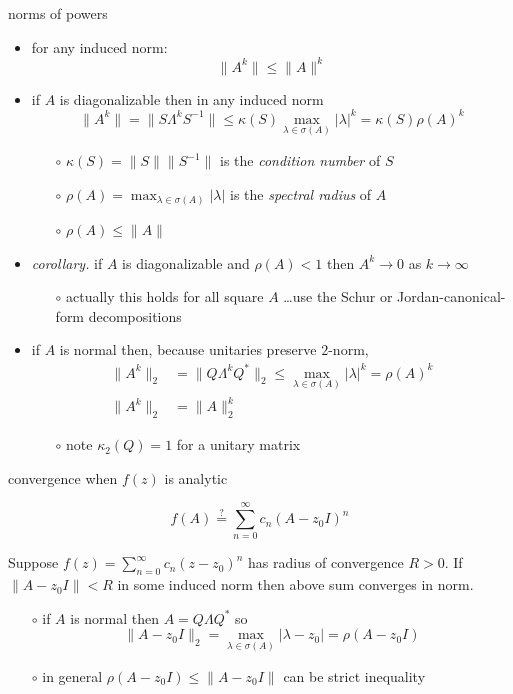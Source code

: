 \documentclass[10pt,hyperref]{beamer}
\begin{document}
\begin{frame}{norms of powers}

\begin{itemize}
\item for any induced norm:
    $$\|A^k\| \le \|A\|^k$$
\item if $A$ is diagonalizable then in any induced norm
    $$\|A^k\| = \|S\Lambda^k S^{-1}\| \le \kappa(S) \max_{\lambda\in\sigma(A)} |\lambda|^k = \kappa(S) \rho(A)^k$$

\vspace{-3mm}
    \begin{itemize}
    \item[$\circ$] $\kappa(S)=\|S\|\|S^{-1}\|$ is the \emph{condition number} of $S$
    \item[$\circ$] $\rho(A)=\max_{\lambda\in\sigma(A)} |\lambda|$ is the \emph{spectral radius} of $A$
    \item[$\circ$] $\rho(A)\le \|A\|$
    \end{itemize}
\item \emph{corollary.} if $A$ is diagonalizable and $\rho(A)<1$ then $A^k \to 0$ as $k\to\infty$
    \begin{itemize}
    \item[$\circ$] actually this holds for all square $A$ \dots use the Schur or Jordan-canonical-form decompositions
    \end{itemize}
\item if $A$ is normal then, because unitaries preserve $2$-norm,
\begin{align*}
\|A^k\|_2 &= \|Q\Lambda^k Q^*\|_2 \le \max_{\lambda\in\sigma(A)} |\lambda|^k = \rho(A)^k \\
\|A^k\|_2 &= \|A\|_2^k
\end{align*}

\vspace{-3mm}
    \begin{itemize}
    \item[$\circ$] note $\kappa_2(Q)=1$ for a unitary matrix
    \end{itemize}
\end{itemize}
\end{frame}


\begin{frame}{convergence when $f(z)$ is analytic}

   $$f(A) \stackrel{?}{=} \sum_{n=0}^\infty c_n (A-z_0 I)^n$$

\begin{lemma}
Suppose $f(z) = \sum_{n=0}^\infty c_n (z-z_0)^n$ has radius of convergence $R>0$. If $\|A-z_0 I\|<R$ in some induced norm then above sum converges in norm.
\end{lemma}

    \begin{itemize}
    \item[$\circ$] if $A$ is normal then $A = Q \Lambda Q^*$ so
    $$\|A - z_0 I\|_2 = \max_{\lambda\in\sigma(A)} |\lambda-z_0| = \rho(A-z_0 I)$$
    \item[$\circ$] in general $\rho(A-z_0 I) \le \|A-z_0 I\|$ can be strict inequality
    \end{itemize}
\end{frame}
\end{document}
